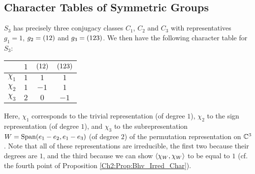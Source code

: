 \subsection{Character Tables of Symmetric Groups}

\begin{example}[$S_3$]
    $S_3$ has precisely three conjugacy classes $C_1$, $C_2$ and $C_3$ with representatives $g_1 = 1$, $g_2 = \left( 1 2 \right)$ and $g_3 = \left( 1 2 3 \right)$. We then have the following character table for $S_3$:
    \begin{table}[H]
        \centering
        \begin{tabular}{c|ccc}
            & $1$ & $\left( 12 \right)$ & $\left( 123 \right)$ \\
            \hline
            $\chi_1$ & $1$ & $1$ & $1$ \\
            $\chi_2$ & $1$ & $-1$ & $1$ \\
            $\chi_3$ & $2$ & $0$ & $-1$
        \end{tabular}
    \end{table}
    Here, $\chi_1$ corresponds to the trivial representation (of degree $1$), $\chi_2$ to the sign representation (of degree $1$), and $\chi_3$ to the subrepresentation $W = \operatorname{Span}\!\left( e_1 - e_2, e_1 - e_3 \right)$ (of degree $2$) of the permutation representation on $\mathbb{C}^3$. Note that all of these representations are irreducible, the first two because their degrees are $1$, and the third because we can show $\left\langle \chi_W, \chi_W \right\rangle$ to be equal to $1$ (cf. the fourth point of Proposition \ref{Ch2:Prop:Bhv_Irred_Char}).
\end{example}


